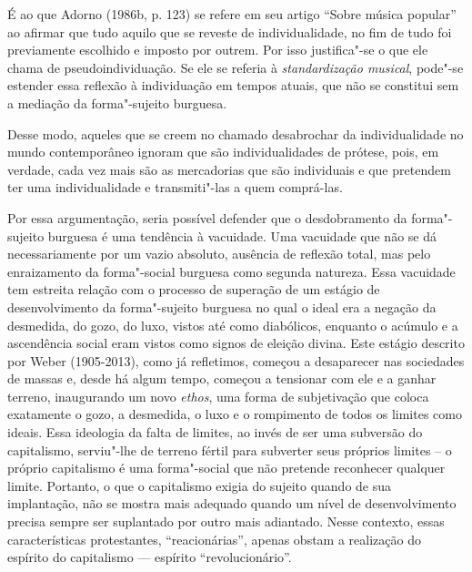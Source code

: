 {É ao que Adorno (1986b, p. 123) se refere em seu artigo ``Sobre música
popular'' ao afirmar que tudo aquilo que se reveste de individualidade,
no fim de tudo foi previamente escolhido e imposto por outrem. Por isso
justifica"-se o que ele chama de pseudoindividuação. Se ele se referia à
\emph{standardização musical}, pode"-se estender essa reflexão à
individuação em tempos atuais, que não se constitui sem a mediação da
forma"-sujeito burguesa.

Desse modo, aqueles que se creem no chamado desabrochar da
individualidade no mundo contemporâneo ignoram que são individualidades
de prótese, pois, em verdade, cada vez mais são as mercadorias que são
individuais e que pretendem ter uma individualidade e transmiti"-las a
quem comprá-las.

Por essa argumentação, seria possível defender que o desdobramento da
forma"-sujeito burguesa é uma tendência à vacuidade. Uma vacuidade que
não se dá necessariamente por um vazio absoluto, ausência de reflexão
total, mas pelo enraizamento da forma"-social burguesa como segunda
natureza. Essa vacuidade tem estreita relação com o processo de
superação de um estágio de desenvolvimento da forma"-sujeito burguesa no
qual o ideal era a negação da desmedida, do gozo, do luxo, vistos até
como diabólicos, enquanto o acúmulo e a ascendência social eram vistos
como signos de eleição divina. Este estágio descrito por Weber
(1905-2013), como já refletimos, começou a desaparecer nas sociedades de
massas e, desde há algum tempo, começou a tensionar com ele e a ganhar
terreno, inaugurando um novo \emph{ethos}, uma forma de subjetivação que
coloca exatamente o gozo, a desmedida, o luxo e o rompimento de todos os
limites como ideais. Essa ideologia da falta de limites, ao invés de ser
uma subversão do capitalismo, serviu"-lhe de terreno fértil para
subverter seus próprios limites -- o próprio capitalismo é uma
forma"-social que não pretende reconhecer qualquer limite.
Portanto, o que o capitalismo exigia do sujeito quando de sua
implantação, não se mostra mais adequado quando um nível de
desenvolvimento precisa sempre ser suplantado por outro mais adiantado.
Nesse contexto, essas características protestantes, ``reacionárias'',
apenas obstam a realização do espírito do capitalismo --- espírito
``revolucionário''.

}
